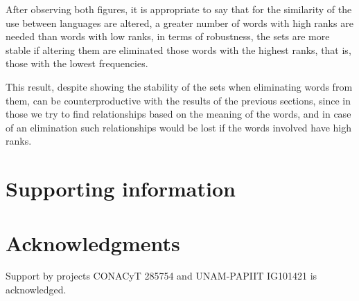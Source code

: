 \documentclass[10pt,letterpaper]{article} %
\begin{document}
After observing both figures, it is appropriate to say that for the similarity of the use between languages are altered, a greater number of words with high ranks are needed than words with low ranks, in terms of robustness, the sets are more stable if altering them are eliminated those words with the highest ranks, that is, those with the lowest frequencies.

This result, despite showing the stability of the sets when eliminating words from them, can be counterproductive with the results of the previous sections, since in those we try to find relationships based on the meaning of the words, and in case of an elimination such relationships would be lost if the words involved have high ranks.


\clearpage

\section*{Supporting information} %
\section*{Acknowledgments} %

\nolinenumbers

Support by projects CONACyT 285754 and UNAM-PAPIIT IG101421 is acknowledged. 



 


\begin{thebibliography}{10} %
%
%
% 




\end{thebibliography} %
\end{document}
